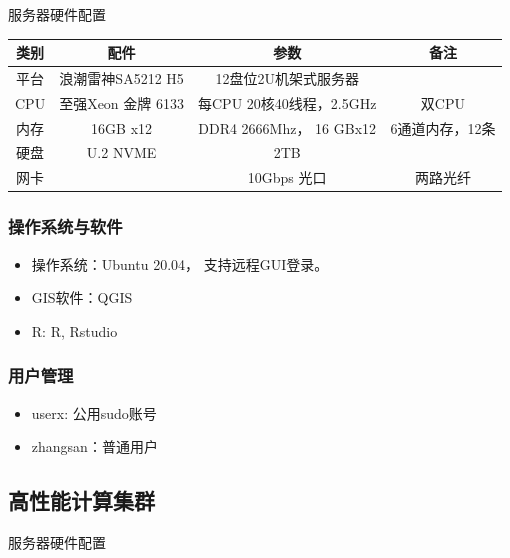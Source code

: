 \documentclass[
]{book}
\providecommand{\tightlist}{%
  \setlength{\itemsep}{0pt}\setlength{\parskip}{0pt}}
\begin{document}
服务器硬件配置

\begin{longtable}[]{@{}cccc@{}}
\toprule()
类别 & 配件 & 参数 & 备注 \\
\midrule()
\endhead
平台 & 浪潮雷神SA5212 H5 & 12盘位2U机架式服务器 & \\
CPU & 至强Xeon 金牌 6133 & 每CPU 20核40线程，2.5GHz & 双CPU \\
内存 & 16GB x12 & DDR4 2666Mhz， 16 GBx12 & 6通道内存，12条 \\
硬盘 & U.2 NVME & 2TB & \\
网卡 & & 10Gbps 光口 & 两路光纤 \\
\bottomrule()
\end{longtable}

\hypertarget{ux64cdux4f5cux7cfbux7edfux4e0eux8f6fux4ef6-1}{%
\subsubsection{操作系统与软件}\label{ux64cdux4f5cux7cfbux7edfux4e0eux8f6fux4ef6-1}}

\begin{itemize}
\tightlist
\item
  操作系统：Ubuntu 20.04， 支持远程GUI登录。
\item
  GIS软件：QGIS
\item
  R: R, Rstudio
\end{itemize}

\hypertarget{ux7528ux6237ux7ba1ux7406-1}{%
\subsubsection{用户管理}\label{ux7528ux6237ux7ba1ux7406-1}}

\begin{itemize}
\tightlist
\item
  userx: 公用sudo账号
\item
  zhangsan：普通用户
\end{itemize}

\hypertarget{ux9ad8ux6027ux80fdux8ba1ux7b97ux96c6ux7fa4}{%
\subsection{高性能计算集群}\label{ux9ad8ux6027ux80fdux8ba1ux7b97ux96c6ux7fa4}}

服务器硬件配置
\end{document}
